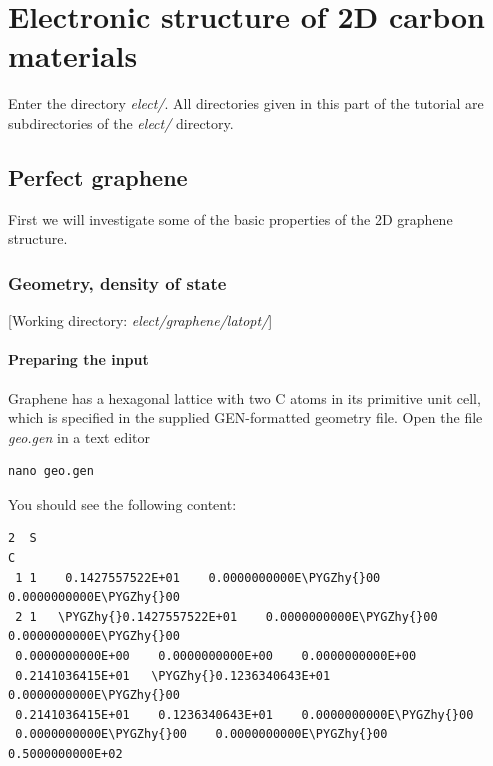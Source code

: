 \documentclass[a4paper,11pt,english]{sphinxmanual}
\def\PYGZhy{\char`\-}
\begin{document}
{{\chapter{Electronic structure of 2D carbon materials}
\label{electstruct:electronic-structure-of-2d-carbon-materials}\label{electstruct::doc}

Enter the directory \emph{elect/}. All
directories given in this part of the tutorial are subdirectories of
the \emph{elect/} directory.


\section{Perfect graphene}
\label{electstruct:perfect-graphene}
First we will investigate some of the basic properties of the 2D
graphene structure.


\subsection{Geometry, density of state}
\label{electstruct:geometry-density-of-state}
{[}Working directory: \emph{elect/graphene/latopt/}{]}


\subsubsection{Preparing the input}
\label{electstruct:preparing-the-input}
Graphene has a hexagonal lattice with two C atoms in its primitive
unit cell, which is specified in the supplied GEN-formatted geometry
file. Open the file \emph{geo.gen} in a text editor

\begin{Verbatim}[commandchars=\\\{\}]
nano geo.gen
\end{Verbatim}

You should see the following content:

\begin{Verbatim}[commandchars=\\\{\}]
2  S
C
 1 1    0.1427557522E+01    0.0000000000E\PYGZhy{}00    0.0000000000E\PYGZhy{}00
 2 1   \PYGZhy{}0.1427557522E+01    0.0000000000E\PYGZhy{}00    0.0000000000E\PYGZhy{}00
 0.0000000000E+00    0.0000000000E+00    0.0000000000E+00
 0.2141036415E+01   \PYGZhy{}0.1236340643E+01    0.0000000000E\PYGZhy{}00
 0.2141036415E+01    0.1236340643E+01    0.0000000000E\PYGZhy{}00
 0.0000000000E\PYGZhy{}00    0.0000000000E\PYGZhy{}00    0.5000000000E+02
\end{Verbatim}

}}
\end{document}
